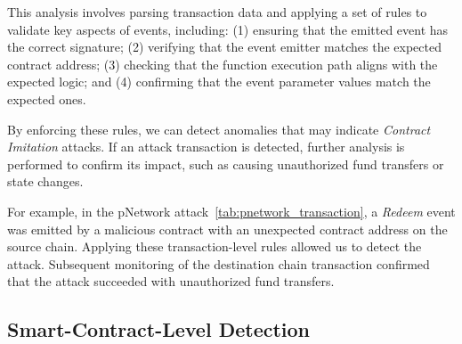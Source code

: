 This analysis involves parsing transaction data and applying a set of rules to validate key aspects of events, including:
(1) ensuring that the emitted event has the correct signature;
(2) verifying that the event emitter matches the expected contract address;
(3) checking that the function execution path aligns with the expected logic; and
(4) confirming that the event parameter values match the expected ones.

By enforcing these rules, we can detect anomalies that may indicate \emph{Contract Imitation} attacks.
If an attack transaction is detected, further analysis is performed to confirm its impact, such as causing unauthorized fund transfers or state changes.

\begin{table}[t]
  \centering
  \caption{Transaction logs of the pNetwork attack.}
  \label{tab:pnetwork_transaction}
  \end{table}

For example, in the pNetwork attack~\cref{tab:pnetwork_transaction}, a \emph{Redeem} event was emitted by a malicious contract with an unexpected contract address on the source chain. Applying these transaction-level rules allowed us to detect the attack. Subsequent monitoring of the destination chain transaction confirmed that the attack succeeded with unauthorized fund transfers.



\subsection{Smart-Contract-Level Detection}

